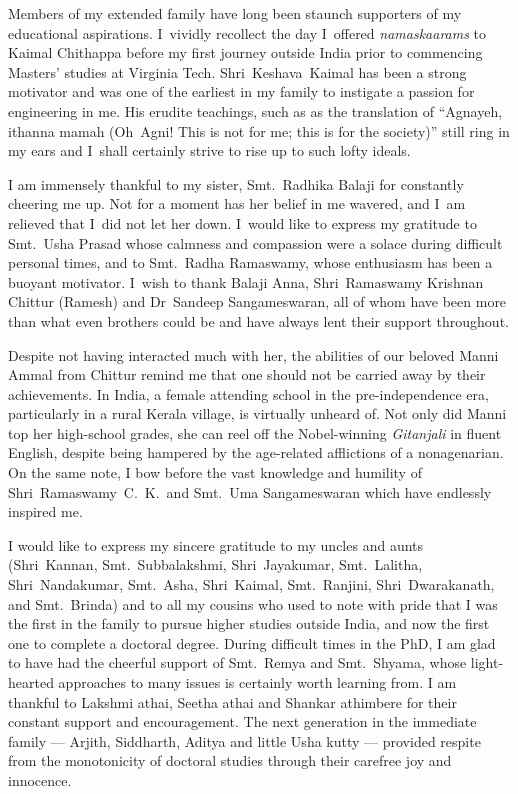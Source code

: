 Members of my extended family have long been staunch supporters of my
educational aspirations. I~vividly recollect the day I~offered
\emph{namaskaarams} to Kaimal Chithappa before my first journey outside India
prior to commencing Masters' studies at Virginia Tech. \mbox{Shri~Keshava
Kaimal} has been a strong motivator and was one of the earliest in my family to
instigate a passion for engineering in me. His erudite teachings, such as as the
translation of  \enquote{Agnayeh, ithanna mamah (Oh~Agni! This is not for me;
this is for the society)} still ring in my ears and I~shall certainly strive to
rise up to such lofty ideals.

I am immensely thankful to my sister, Smt.~Radhika Balaji for constantly
cheering me up. Not for a moment has her belief in me wavered, and I~am relieved
that I~did not let her down. I~would like to express my gratitude to Smt.~Usha
Prasad whose calmness and compassion were a solace during difficult personal
times, and to Smt.~Radha Ramaswamy, whose enthusiasm has been a  buoyant
motivator. I~wish to thank Balaji Anna, Shri~Ramaswamy Krishnan Chittur (Ramesh)
and Dr~Sandeep Sangameswaran, all of whom have been more than what even brothers
could be and have always lent their support throughout.


\addlines[1]

Despite not having interacted much with her, the abilities of our beloved Manni
Ammal from Chittur remind me that one should not be carried away by their
achievements. In India, a female attending school in the pre-independence era,
particularly in a rural Kerala village, is virtually unheard of. Not only did
Manni top her high-school grades, she can reel off the Nobel-winning
\emph{Gitanjali} in fluent English, despite being hampered by the age-related
afflictions of a nonagenarian. On the same note, I bow before the vast knowledge
and humility of Shri~Ramaswamy~C.~K.\ and Smt.~Uma Sangameswaran which have
endlessly inspired me.


I would like to express my sincere gratitude to my uncles and aunts
(Shri~Kannan, Smt.~Subbalakshmi, Shri~Jayakumar, Smt.~Lalitha,  Shri~Nandakumar,
Smt.~Asha, Shri~Kaimal, Smt.~Ranjini, Shri~Dwarakanath, and Smt.~Brinda) and to
all my cousins who used to note with pride that I was the first in the family to
pursue higher studies outside India, and now the first one to complete a
doctoral degree. During  difficult times in the PhD, I am glad to have had the
cheerful support of Smt.~Remya and Smt.~Shyama, whose light-hearted approaches
to many issues is certainly worth learning from. I am thankful to Lakshmi athai,
Seetha athai and Shankar athimbere for their constant support and encouragement.
The next generation in the immediate family --- Arjith, Siddharth, Aditya and
little Usha kutty --- provided respite from the monotonicity of doctoral studies
through their carefree joy and innocence.


